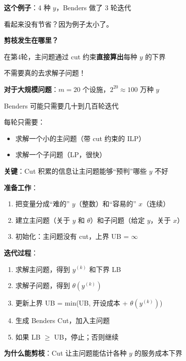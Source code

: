 \documentclass[12pt, a4paper]{ctexart}
\begin{document}
\begin{blackboard}

\textbf{这个例子}：4 种 $y$，Benders 做了 3 轮迭代

看起来没有节省？因为例子太小了。

\textbf{剪枝发生在哪里？}

在第4轮，主问题通过 cut 约束\textbf{直接算出}每种 $y$ 的下界

不需要真的去求解子问题！

\textbf{对于大规模问题}：$m = 20$ 个设施，$2^{20} \approx 100$ 万种 $y$

Benders 可能只需要几十到几百轮迭代

每轮只需要：
\begin{itemize}
    \item 求解一个小的主问题（带 cut 约束的 ILP）
    \item 求解一个子问题（LP，很快）
\end{itemize}

\textbf{关键}：Cut 积累的信息让主问题能够``预判''哪些 $y$ 不好

\end{blackboard}

\begin{blackboard}

\textbf{准备工作}：
\begin{enumerate}
    \item 把变量分成``难的'' $y$（整数）和``容易的'' $x$（连续）
    \item 建立主问题（关于 $y$ 和 $\theta$）和子问题（给定 $y$，关于 $x$）
    \item 初始化：主问题没有 cut，上界 UB = $\infty$
\end{enumerate}

\textbf{迭代过程}：
\begin{enumerate}
    \item 求解主问题，得到 $y^{(k)}$ 和下界 LB
    \item 求解子问题，得到 $\theta(y^{(k)})$
    \item 更新上界 UB = min(UB, 开设成本 + $\theta(y^{(k)})$)
    \item 生成 Benders Cut，加入主问题
    \item 如果 LB $\geq$ UB，停止；否则继续
\end{enumerate}

\textbf{为什么能剪枝}：Cut 让主问题能估计各种 $y$ 的服务成本下界

\end{blackboard}
\end{document}
